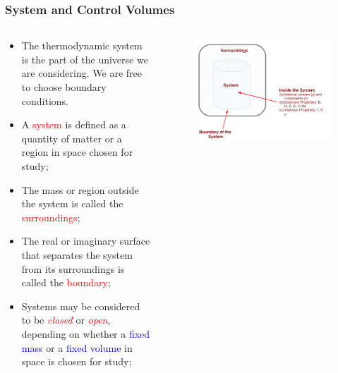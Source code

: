 \documentclass[10pt,compress]{beamer}
\newcommand{\red}{\textcolor{red}}
\newcommand{\blue}{\textcolor{blue}}
\begin{document}
\scriptsize
\begin{frame}
 \frametitle{System and Control Volumes}
  \begin{columns}
    \begin{column}[l]{0.55\linewidth}
      \begin{itemize}%
       \item <2-> The thermodynamic system is the part of the universe we are considering. We are free to choose boundary conditions.
       \item <3-> A \textcolor{red}{system} is defined as a quantity of matter or a region in space chosen for study;
       \item <4-> The mass or region outside the system is called the \textcolor{red}{surroundings};
       \item <5-> The real or imaginary surface that separates the system from its surroundings is called the \textcolor{red}{boundary};
       \item <6-> Systems may be considered to be \red{\it closed} or \red{\it open}, depending on whether a \blue{fixed mass} or a \blue{fixed volume} in space is chosen for study; 
      \end{itemize}
    \end{column}
    \begin{column}[l]{0.45\linewidth}\scriptsize
      \begin{figure}%
        \begin{center}
          \includegraphics[width=1.05\columnwidth,clip]{./Pics/Fig_SystemDefinition}
        \end{center}

\end{figure}
\end{column}
\end{columns}
\end{frame}
\end{document}
